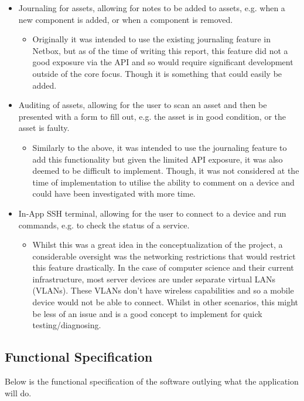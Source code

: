 \documentclass [11pt,a4paper]{article}
\begin{document}
\begin{itemize}
\item Journaling for assets, allowing for notes to be added to assets, e.g. when a new component is added, or when a component is removed.
\begin{itemize}
    \item Originally it was intended to use the existing journaling feature in Netbox, but as of the time of writing this report, this feature did not a good exposure via the API and so would require significant development outside of the core focus. Though it is something that could easily be added.
\end{itemize} 

\item Auditing of assets, allowing for the user to scan an asset and then be presented with a form to fill out, e.g. the asset is in good condition, or the asset is faulty. 
\begin{itemize}
    \item Similarly to the above, it was intended to use the journaling feature to add this functionality but given the limited API exposure, it was also deemed to be difficult to implement. Though, it was not considered at the time of implementation to utilise the ability to comment on a device and could have been investigated with more time. 
\end{itemize} 

\item In-App SSH terminal, allowing for the user to connect to a device and run commands, e.g. to check the status of a service. 
\begin{itemize}
    \item Whilst this was a great idea in the conceptualization of the project, a considerable oversight was the networking restrictions that would restrict this feature drastically. In the case of computer science and their current infrastructure, most server devices are under separate virtual LANs (VLANs). These VLANs don't have wireless capabilities and so a mobile device would not be able to connect. Whilst in other scenarios, this might be less of an issue and is a good concept to implement for quick testing/diagnosing. 
\end{itemize} 

\end{itemize}

\pagebreak

\subsection{Functional Specification}
\label{sec:func_spec}
Below is the functional specification of the software outlying what the application will do.
\end{document}
